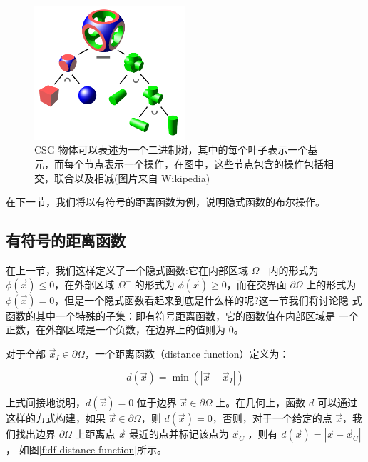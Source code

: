 \begin{figure}
	\sidecaption
	\includegraphics[width=0.5\textwidth]{figures/df/Csg-tree}
	\caption{CSG 物体可以表述为一个二进制树，其中的每个叶子表示一个基元，而每个节点表示一个操作，在图中，这些节点包含的操作包括相交，联合以及相减(图片来自 Wikipedia)}
	\label{f:df-csg-tree}
\end{figure}

在下一节，我们将以有符号的距离函数为例，说明隐式函数的布尔操作。



\subsection{有符号的距离函数}
在上一节，我们这样定义了一个隐式函数:它在内部区域 $\Omega^{−}$ 内的形式为 $\phi(\vec{x}) \leq 0$，在外部区域 $\Omega^{+}$ 的形式为 $\phi(\vec{x}) \geq 0$，而在交界面 $\partial\Omega$ 上的形式为 $\phi(\vec{x}) = 0$，但是一个隐式函数看起来到底是什么样的呢?这一节我们将讨论隐 式函数的其中一个特殊的子集：即有符号距离函数，它的函数值在内部区域是 一个正数，在外部区域是一个负数，在边界上的值则为 0。

对于全部 $\vec{x}_I \in\partial\Omega$，一个距离函数（distance function）定义为：

\begin{equation}
	d(\vec{x})=\min (|\vec{x}-\vec{x}_I|)
\end{equation}

上式间接地说明，$d(\vec{x}) = 0$ 位于边界 $\vec{x}\in\partial\Omega$ 上。在几何上，函数 $d$ 可以通过这样的方式构建，如果 $\vec{x}\in \partial\Omega$，则 $d(\vec{x}) = 0$，否则，对于一个给定的点 $\vec{x}$，我 们找出边界 $\partial\Omega$ 上距离点 $\vec{x}$ 最近的点并标记该点为 $\vec{x}_C$ ，则有 $d(\vec{x}) = |\vec{x} − \vec{x}_C |$， 如图\ref{f:df-distance-function}所示。

